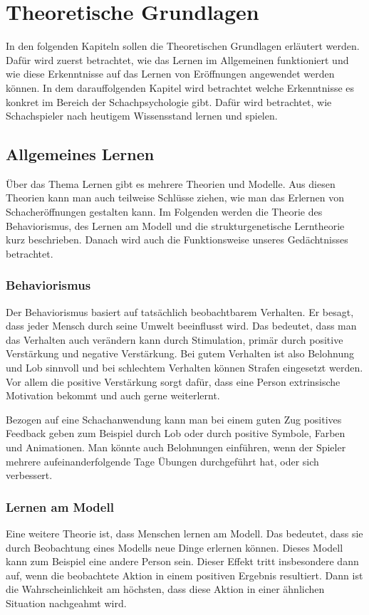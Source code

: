 
\chapter{Theoretische Grundlagen}
In den folgenden Kapiteln sollen die Theoretischen Grundlagen erläutert werden. Dafür wird zuerst betrachtet, wie das Lernen im Allgemeinen funktioniert und wie diese Erkenntnisse auf das Lernen von Eröffnungen angewendet werden können.
In dem darauffolgenden Kapitel wird betrachtet welche Erkenntnisse es konkret im Bereich der Schachpsychologie gibt. Dafür wird betrachtet, wie Schachspieler nach heutigem Wissensstand lernen und spielen.

\section{Allgemeines Lernen}
Über das Thema Lernen gibt es mehrere Theorien und Modelle. Aus diesen Theorien kann man auch teilweise Schlüsse ziehen, wie man das Erlernen von Schacheröffnungen gestalten kann.
Im Folgenden werden die Theorie des Behaviorismus, des Lernen am Modell und die strukturgenetische Lerntheorie kurz beschrieben.
Danach wird auch die Funktionsweise unseres Gedächtnisses betrachtet.

\subsection{Behaviorismus}
Der Behaviorismus basiert auf tatsächlich beobachtbarem Verhalten. Er besagt, dass jeder Mensch durch seine Umwelt beeinflusst wird. Das bedeutet, dass man das Verhalten auch verändern kann durch Stimulation, primär durch positive Verstärkung und negative Verstärkung. Bei gutem Verhalten ist also Belohnung und Lob sinnvoll und bei schlechtem Verhalten können Strafen eingesetzt werden. Vor allem die positive Verstärkung sorgt dafür, dass eine Person extrinsische Motivation bekommt und auch gerne weiterlernt.\cite{kron_grundwissen_2024}

Bezogen auf eine Schachanwendung kann man bei einem guten Zug positives Feedback geben zum Beispiel durch Lob oder durch positive Symbole, Farben und Animationen. Man könnte auch Belohnungen einführen, wenn der Spieler mehrere aufeinanderfolgende Tage Übungen durchgeführt hat, oder sich verbessert.

\subsection{Lernen am Modell}
Eine weitere Theorie ist, dass Menschen lernen am Modell. Das bedeutet, dass sie durch Beobachtung eines Modells neue Dinge erlernen können. Dieses Modell kann zum Beispiel eine andere Person sein.
Dieser Effekt tritt insbesondere dann auf, wenn die beobachtete Aktion in einem positiven Ergebnis resultiert. Dann ist die Wahrscheinlichkeit am höchsten, dass diese Aktion in einer ähnlichen Situation nachgeahmt wird.\cite{kron_grundwissen_2024}

